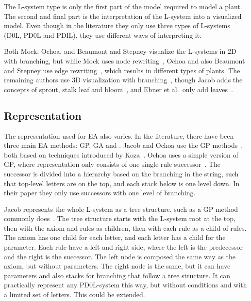 The \gls{L-system} type is only the first part of the model required to model a plant.
The second and final part is the interpretation of the \gls{L-system} into a visualized model.
Even though in the literature they only use three types of \glspl{L-system} (D0L, PD0L and PDIL), they use different ways of interpreting it.

Both Mock, Ochoa, and Beaumont and Stepney visualize the \glspl{L-system} in 2D with branching, but while Mock uses node rewriting~\cite{1998Mock}, Ochoa and also Beaumont and Stepney use edge rewriting~\cite{1998Ochoa,2009Beaumont}, which results in different types of plants.
The remaining authors use 3D visualization with branching~\cite{1994Jacob,2006Ashlock}, though Jacob adds the concepts of sprout, stalk leaf and bloom~\cite{1995Jacob}, and Ebner et al.\ only add leaves~\cite{2002Ebner,2003Ebner}.

\subsection{Representation}
The representation used for \gls{EA} also varies.
In the literature, there have been three main \gls{EA} methods: \gls{GP}, \gls{GA} and .
Jacob and Ochoa use the \gls{GP} methods~\cite{1994Jacob,1995Jacob,1998Ochoa}, both based on techniques introduced by Koza~\cite{1992Koza}.
Ochoa uses a simple version of \gls{GP}, where representation only consists of one single rule successor~\cite{1998Ochoa}.
The successor is divided into a hierarchy based on the branching in the string, such that top-level letters are on the top, and each stack below is one level down.
In their paper they only use successors with one level of branching.

Jacob represents the whole \gls{L-system} as a tree structure, such as a \gls{GP} method commonly does~\cite{1994Jacob}.
The tree structure starts with the \gls{L-system} root at the top, then with the axiom and rules as children, then with each rule as a child of rules.
The axiom has one child for each letter, and each letter has a child for the parameter.
Each rule have a left and right side, where the left is the predecessor and the right is the successor.
The left node is composed the same way as the axiom, but without parameters.
The right node is the same, but it can have parameters and also stacks for branching that follow a tree structure.
It can practically represent any PD0L-system this way, but without conditions and with a limited set of letters.
This could be extended.

